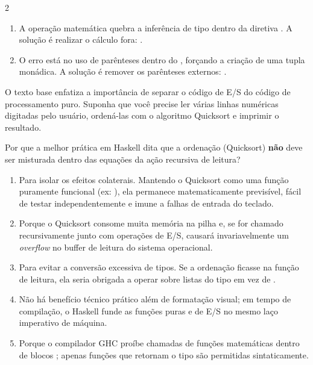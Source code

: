 \documentclass[a4paper,10pt,brazil]{article}
\begin{document}
\begin{multicols}{2}
\begin{enumerate}
  \item A operação matemática  quebra a inferência de tipo dentro da diretiva . A solução é realizar o cálculo fora: .
  \item O erro está no uso de parênteses dentro do , forçando a criação de uma tupla monádica. A solução é remover os parênteses externos: .


\end{enumerate}

O texto base enfatiza a importância de separar o código de E/S do código de processamento puro. Suponha que você precise ler várias linhas numéricas digitadas pelo usuário, ordená-las com o algoritmo Quicksort e imprimir o resultado. 

Por que a melhor prática em Haskell dita que a ordenação (Quicksort) \textbf{não} deve ser misturada dentro das equações da ação recursiva de leitura?

\begin{enumerate}
  \item Para isolar os efeitos colaterais. Mantendo o Quicksort como uma função puramente funcional (ex: \haskellinline{[Int] -> [Int]}), ela permanece matematicamente previsível, fácil de testar independentemente e imune a falhas de entrada do teclado.

  \item Porque o Quicksort consome muita memória na pilha e, se for chamado recursivamente junto com operações de E/S, causará invariavelmente um \emph{overflow} no buffer de leitura do sistema operacional.

  \item Para evitar a conversão excessiva de tipos. Se a ordenação ficasse na função de leitura, ela seria obrigada a operar sobre listas do tipo \haskellinline{[IO Int]} em vez de \haskellinline{[Int]}.

  \item Não há benefício técnico prático além de formatação visual; em tempo de compilação, o Haskell funde as funções puras e de E/S no mesmo laço imperativo de máquina.

  \item Porque o compilador GHC proíbe chamadas de funções matemáticas dentro de blocos ; apenas funções que retornam o tipo  são permitidas sintaticamente.



\end{enumerate}
\end{multicols}
\end{document}
